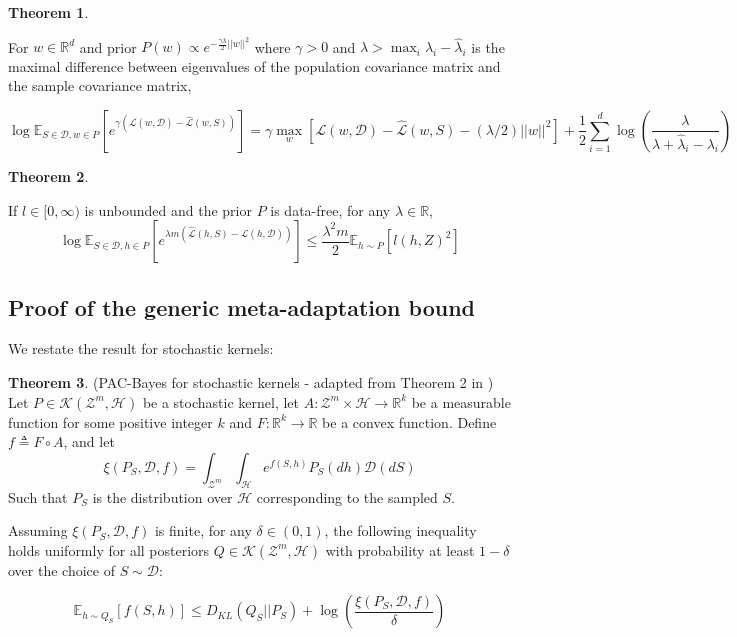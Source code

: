 \documentclass{article}
\theoremstyle{definition}
\newtheorem{theorem}{Theorem}[section]
\newcommand{\Expect}[2]{\mathbb{E}_{#1}\left [#2 \right ]}
\begin{document}
\begin{theorem} \citep{Rivasplata2020}
	
	For $w\in\mathbb{R}^d$ and prior $P(w)\propto e^{-\frac{\gamma\lambda}{2}||w||^2}$ where $\gamma>0$ and $\lambda>\max_i{\lambda_i-\hat{\lambda}_i}$ is the maximal difference between eigenvalues of the population covariance matrix and the sample covariance matrix,
	
	$$\log \Expect{S\in \mathcal{D}, w\in P}{e^{\gamma(\mathcal{L}(w,\mathcal{D})-\hat{\mathcal{L}}(w,S))}} = \gamma\max_w{\left [\mathcal{L}(w,\mathcal{D})-\hat{\mathcal{L}}(w,S)-(\lambda/2)||w||^2\right ]} + \frac{1}{2}\sum_{i=1}^{d}\log\left (\frac{\lambda}{\lambda+\hat{\lambda}_i-\lambda_i} \right ) $$
\end{theorem}

\begin{theorem} \citep{Rivasplata2020}
	
	If $l\in[0,\infty)$ is unbounded and the prior $P$ is data-free, for any $\lambda\in \mathbb{R}$,
	$$\log \Expect{S\in \mathcal{D}, h\in P}{e^{\lambda m(\hat{\mathcal{L}}(h,S)-\mathcal{L}(h,\mathcal{D}))}} \leq \frac{\lambda^2m}{2}\Expect{h\sim P}{l(h,Z)^2}$$
\end{theorem}

\subsection{Proof of the generic meta-adaptation bound} \label{append:proof-main-result}

We restate the result for stochastic kernels:

\begin{theorem} (PAC-Bayes for stochastic kernels - adapted from Theorem 2 in \citet{Rivasplata2020}) \label{thm:rivasplata-pb-appendix}
	Let $P\in \mathcal{K}(\mathcal{Z}^m, \mathcal{H})$ be a stochastic kernel, let $A: \mathcal{Z}^m\times \mathcal{H}\rightarrow \mathbb{R}^k$ be a measurable function for some positive integer $k$ and $F:\mathbb{R}^k\rightarrow \mathbb{R}$ be a convex function.
	Define $f\triangleq F\circ A$, and let 
	$$\xi(P_S, \mathcal{D}, f)=\int_{\mathcal{Z}^m}\int_{\mathcal{H}}e^{f(S, h)}P_S(dh)\mathcal{D}(dS)$$
	Such that $P_S$ is the distribution over $\mathcal{H}$ corresponding to the sampled $S$.
	
	Assuming $\xi(P_S, \mathcal{D}, f)$ is finite, for any $\delta \in (0,1)$, the following inequality holds uniformly for all posteriors $Q\in \mathcal{K}(\mathcal{Z}^m, \mathcal{H})$ with probability at least $1-\delta$ over the choice of $S\sim \mathcal{D}$:
	
	\begin{equation} \label{eq:ribasplata-pb-appendix}
	\Expect{h\sim Q_S}{f(S, h)} \leq D_{KL}(Q_S||P_S)+\log\left (\frac{\xi(P_S, \mathcal{D}, f)}{\delta}\right )
	\end{equation}
\end{theorem}
\end{document}
